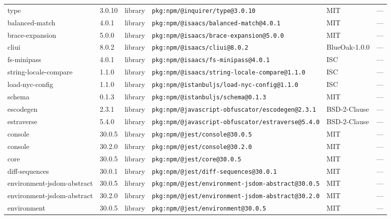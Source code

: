 \documentclass[11pt,a4paper]{article}
\begin{document}
\begin{longtable}{|p{4cm}|p{2cm}|p{1.6cm}|p{5cm}|p{1.5cm}|p{3.5cm}|}
\raggedright type & 3.0.10 & library & \small\texttt{pkg:npm/@inquirer/type@3.0.10} & MIT & \small — \\
\raggedright balanced-match & 4.0.1 & library & \small\texttt{pkg:npm/@isaacs/balanced-match@4.0.1} & MIT & \small — \\
\raggedright brace-expansion & 5.0.0 & library & \small\texttt{pkg:npm/@isaacs/brace-expansion@5.0.0} & MIT & \small — \\
\raggedright cliui & 8.0.2 & library & \small\texttt{pkg:npm/@isaacs/cliui@8.0.2} & BlueOak-1.0.0 & \small — \\
\raggedright fs-minipass & 4.0.1 & library & \small\texttt{pkg:npm/@isaacs/fs-minipass@4.0.1} & ISC & \small — \\
\raggedright string-locale-compare & 1.1.0 & library & \small\texttt{pkg:npm/@isaacs/string-locale-compare@1.1.0} & ISC & \small — \\
\raggedright load-nyc-config & 1.1.0 & library & \small\texttt{pkg:npm/@istanbuljs/load-nyc-config@1.1.0} & ISC & \small — \\
\raggedright schema & 0.1.3 & library & \small\texttt{pkg:npm/@istanbuljs/schema@0.1.3} & MIT & \small — \\
\raggedright escodegen & 2.3.1 & library & \small\texttt{pkg:npm/@javascript-obfuscator/escodegen@2.3.1} & BSD-2-Clause & \small — \\
\raggedright estraverse & 5.4.0 & library & \small\texttt{pkg:npm/@javascript-obfuscator/estraverse@5.4.0} & BSD-2-Clause & \small — \\
\raggedright console & 30.0.5 & library & \small\texttt{pkg:npm/@jest/console@30.0.5} & MIT & \small — \\
\raggedright console & 30.2.0 & library & \small\texttt{pkg:npm/@jest/console@30.2.0} & MIT & \small — \\
\raggedright core & 30.0.5 & library & \small\texttt{pkg:npm/@jest/core@30.0.5} & MIT & \small — \\
\raggedright diff-sequences & 30.0.1 & library & \small\texttt{pkg:npm/@jest/diff-sequences@30.0.1} & MIT & \small — \\
\raggedright environment-jsdom-abstract & 30.0.5 & library & \small\texttt{pkg:npm/@jest/environment-jsdom-abstract@30.0.5} & MIT & \small — \\
\raggedright environment-jsdom-abstract & 30.2.0 & library & \small\texttt{pkg:npm/@jest/environment-jsdom-abstract@30.2.0} & MIT & \small — \\
\raggedright environment & 30.0.5 & library & \small\texttt{pkg:npm/@jest/environment@30.0.5} & MIT & \small — \\

\end{longtable}
\end{document}
